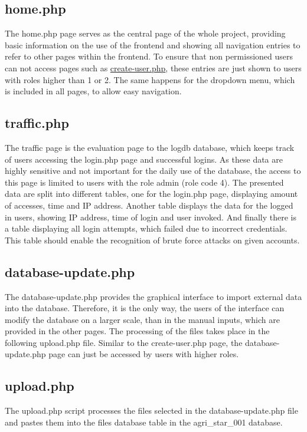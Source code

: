 
\subsection{home.php}

The home.php page serves as the central page of the whole project, providing basic information on the use of the frontend and showing all navigation entries to refer to other pages 
within the frontend. To ensure that non permissioned users can not access pages such as \hyperref[create-user.php]{create-user.php}, these entries are just shown to users with roles 
higher than 1 or 2. The same happens for the dropdown menu, which is included in all pages, to allow easy navigation. 

\subsection{traffic.php}
The traffic page is the evaluation page to the logdb database, which keeps track of users accessing the login.php page and successful logins. As these data are highly sensitive and 
not important for the daily use of the database, the access to this page is limited to users with the role admin (role code 4). The presented data are split into different tables, 
one for the login.php page, displaying amount of accesses, time and IP address. Another table displays the data for the logged in users, showing IP address, time of login and user 
invoked. And finally there is a table displaying all login attempts, which failed due to incorrect credentials. This table should enable the recognition of brute force attacks on 
given accounts.

\subsection{database-update.php}
The database-update.php provides the graphical interface to import external data into the database. Therefore, it is the only way, the users of the interface can modify the database 
on a larger scale, than in the manual inputs, which are provided in the other pages. The processing of the files takes place in the following upload.php file. Similar to the 
create-user.php page, the database-update.php page can just be accessed by users with higher roles. 

\subsection{upload.php}
The upload.php script processes the files selected in the database-update.php file and pastes them into the files database table in the agri\_star\_001 database.
